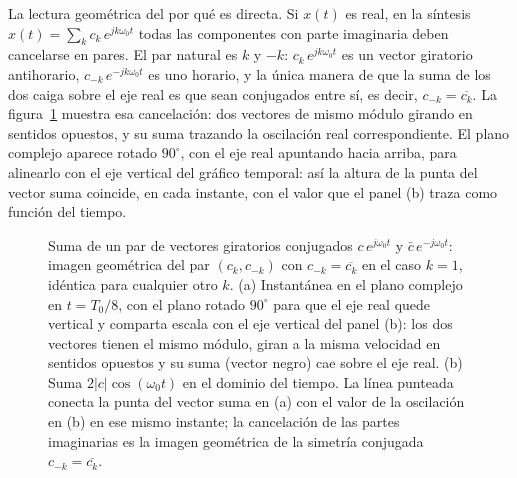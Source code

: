 \documentclass[class=book, crop=false]{standalone}
\begin{document}
La lectura geométrica del por qué es directa. Si $x(t)$ es real, en
la síntesis $x(t) = \sum_k c_k\,e^{jk\omega_0 t}$ todas las
componentes con parte imaginaria deben cancelarse en pares. El par
natural es $k$ y $-k$: $c_k\,e^{jk\omega_0 t}$ es un vector giratorio
antihorario, $c_{-k}\,e^{-jk\omega_0 t}$ es uno horario, y la única
manera de que la suma de los dos caiga sobre el eje real es que
sean conjugados entre sí, es decir, $c_{-k} = \overline{c_k}$.
La figura~\ref{fig:pares_conjugados} muestra esa cancelación: dos
vectores de mismo módulo girando en sentidos opuestos, y su suma
trazando la oscilación real correspondiente. El plano complejo
aparece rotado $90^\circ$, con el eje real apuntando hacia arriba,
para alinearlo con el eje vertical del gráfico temporal: así la
altura de la punta del vector suma coincide, en cada instante,
con el valor que el panel (b) traza como función del tiempo.

\begin{figure}[H]
    \centering
    \begin{minipage}{\linewidth}
        \centering
        
        \caption{Suma de un par de vectores giratorios conjugados
                 $c\,e^{j\omega_0 t}$ y $\bar{c}\,e^{-j\omega_0 t}$:
                 imagen geométrica del par $(c_k, c_{-k})$ con
                 $c_{-k} = \overline{c_k}$ en el caso $k=1$,
                 idéntica para cualquier otro $k$.
                 (a) Instantánea en el plano complejo en
                 $t = T_0/8$, con el plano rotado $90^\circ$ para
                 que el eje real quede vertical y comparta escala
                 con el eje vertical del panel (b): los dos
                 vectores tienen el mismo módulo, giran a la misma
                 velocidad en sentidos opuestos y su suma (vector
                 negro) cae sobre el eje real. (b) Suma
                 $2|c|\cos(\omega_0 t)$ en el dominio del
                 tiempo. La línea punteada conecta la punta del
                 vector suma en (a) con el valor de la oscilación
                 en (b) en ese mismo instante; la cancelación de
                 las partes imaginarias es la imagen geométrica
                 de la simetría conjugada $c_{-k} = \overline{c_k}$.}
        \label{fig:pares_conjugados}
    \end{minipage}
\end{figure}
\end{document}
